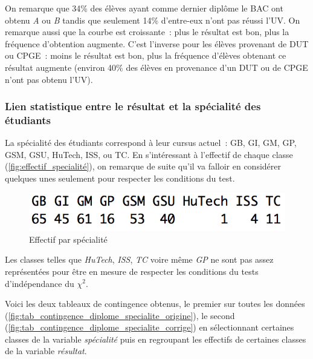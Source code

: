 \documentclass[a4paper,11pt]{report}
\begin{document}
On remarque que 34\% des élèves ayant comme dernier diplôme le BAC ont obtenu \textit{A} ou \textit{B} tandis que seulement 14\% d'entre-eux n'ont pas réussi l'UV. On remarque aussi que la courbe est croissante~: plus le résultat est bon, plus la fréquence d'obtention augmente. C'est l'inverse pour les élèves provenant de DUT ou CPGE~: moins le résultat est bon, plus la fréquence d'élèves obtenant ce résultat augmente (environ 40\% des élèves en provenance d'un DUT ou de CPGE n'ont pas obtenu l'UV).


\subsubsection{Lien statistique entre le résultat et la spécialité des étudiants}

La spécialité des étudiants correspond à leur cursus actuel~: GB, GI, GM, GP, GSM, GSU, HuTech, ISS, ou TC. En s'intéressant à l'effectif de chaque classe (\autoref{fig:effectif_specialité}), on remarque de suite qu'il va falloir en considérer quelques unes seulement pour respecter les conditions du test.

\begin{figure}[H]
	\centering
	\captionsetup{justification=centering, margin=2cm}
	\includegraphics[width=.5\linewidth]{img/1-1-2-Effectf-specialite}
	\caption{\scriptsize Effectif par spécialité}
	\label{fig:effectif_specialité}
\end{figure}

Les classes telles que \textit{HuTech}, \textit{ISS}, \textit{TC} voire même \textit{GP} ne sont pas assez représentées pour être en mesure de respecter les conditions du tests d'indépendance du $\chi^2$.

Voici les deux tableaux de contingence obtenus, le premier sur toutes les données (\autoref{fig:tab_contingence_diplome_specialite_origine}), le second (\autoref{fig:tab_contingence_diplome_specialite_corrige}) en sélectionnant certaines classes de la variable \textit{spécialité} puis en regroupant les effectifs de certaines classes de la variable \textit{résultat}.
\end{document}
